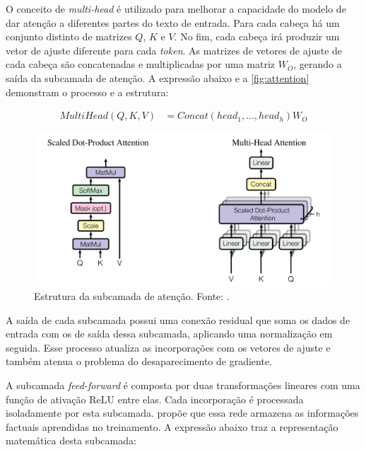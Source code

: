 O conceito de \textit{multi-head} é utilizado para melhorar a capacidade do modelo de dar atenção a diferentes partes do texto de entrada. Para cada cabeça há um
conjunto distinto de matrizes \begin{math}Q\end{math}, \begin{math}K\end{math} e \begin{math}V\end{math}. No fim, cada cabeça irá produzir um vetor de ajuste diferente
para cada \textit{token}. As matrizes de vetores de ajuste de cada cabeça são concatenadas e multiplicadas por uma matriz \begin{math}W_O\end{math}, gerando a saída da
subcamada de atenção. A expressão abaixo e a \autoref{fig:attention} demonstram o processo e a estrutura:

\begin{align*}
      MultiHead(Q, K, V) &= Concat(head_1,...,head_h)W_O
\end{align*}

\begin{figure}[ht]
      \centering
      \includegraphics[width=0.7\columnwidth,keepaspectratio]{images/attention.png}
      \caption{Estrutura da subcamada de atenção. Fonte: \textcite{transformer}.}
      \label{fig:attention}
\end{figure}

A saída de cada subcamada possui uma conexão residual que soma os dados de entrada com os de saída dessa subcamada, aplicando uma normalização em seguida. Esse processo
atualiza as incorporações com os vetores de ajuste e também atenua o problema do desaparecimento de gradiente.

A subcamada \textit{feed-forward} é composta por duas transformações lineares com uma função de ativação \ac{ReLU} entre elas. Cada incorporação é processada
isoladamente por esta subcamada. \textcite{feed_forward_knowledge} propõe que essa rede armazena as informações factuais aprendidas no treinamento. A expressão abaixo
traz a representação matemática desta subcamada:

